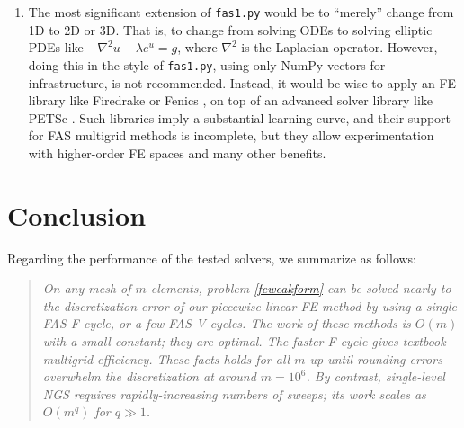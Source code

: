 \documentclass[letterpaper,final,12pt,reqno]{amsart}
\newcommand{\grad}{\nabla}
\begin{document}
\begin{enumerate}
\item The most significant extension of \texttt{fas1.py} would be to ``merely'' change from 1D to 2D or 3D.  That is, to change from solving ODEs to solving elliptic PDEs like $-\grad^2 u - \lambda e^u=g$, where $\grad^2$ is the Laplacian operator.  However, doing this in the style of \texttt{fas1.py}, using only NumPy vectors for infrastructure, is not recommended.  Instead, it would be wise to apply an FE library like Firedrake \cite{Rathgeberetal2016} or Fenics \cite{Loggetal2012}, on top of an advanced solver library like PETSc \cite{Balayetal2021,Bueler2021}.  Such libraries imply a substantial learning curve, and their support for FAS multigrid methods is incomplete, but they allow experimentation with higher-order FE spaces and many other benefits.
\end{enumerate}


\section{Conclusion}  \label{sec:conclusion}

Regarding the performance of the tested solvers, we summarize as follows:

\begin{quotation}
\emph{On any mesh of $m$ elements, problem \eqref{feweakform} can be solved nearly to the discretization error of our piecewise-linear FE method by using a single FAS F-cycle, or a few FAS V-cycles.  The work of these methods is $O(m)$ with a small constant; they are optimal.  The faster F-cycle gives textbook multigrid efficiency.  These facts holds for all $m$ up until rounding errors overwhelm the discretization at around $m=10^6$.  By contrast, single-level NGS requires rapidly-increasing numbers of sweeps; its work scales as $O(m^q)$ for $q\gg 1$.}
\end{quotation}

\small

\bigskip


\end{document}
